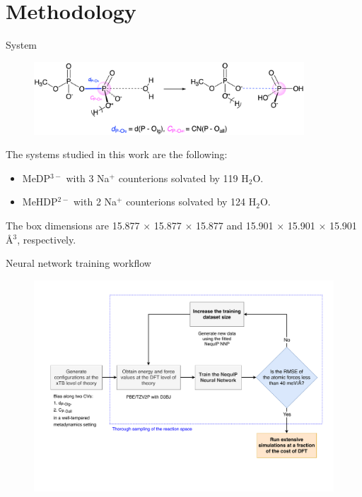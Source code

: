 \documentclass[11pt,t]{beamer}
\begin{document}
\section{Methodology}
\begin{frame}{System}
	\vspace{-5pt}
	\begin{figure}
		\centering
		\includegraphics[width=0.9\textwidth]{Figures/methods_collective_variables.png}
	\end{figure}
	\small
	The systems studied in this work are the following:
	\begin{itemize}
		\item MeDP$^{3-}$ with 3 Na$^+$ counterions solvated by 119 H$_2$O.
		\item MeHDP$^{2-}$ with 2 Na$^+$ counterions solvated by 124 H$_2$O.
	\end{itemize}
	The box dimensions are 15.877 $\times$ 15.877 $\times$ 15.877 and 15.901 $\times$ 15.901 $\times$ 15.901 \AA$^3$, respectively.
\end{frame}



\begin{frame}{Neural network training workflow}
	\vspace{-10pt}
	\begin{figure}
		\centering
		\includegraphics[width=1.0\textwidth]{Figures/methods_workflow_diagram.pdf}
	\end{figure}
\end{frame}
\end{document}
